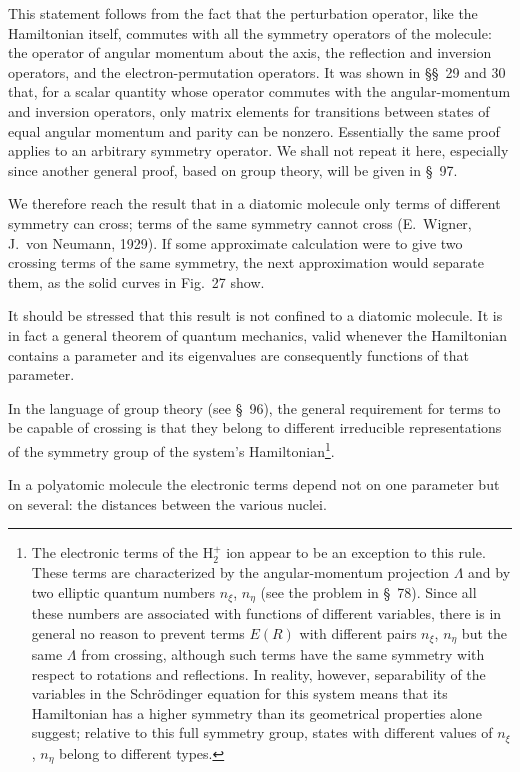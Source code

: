 This statement follows from the fact that the perturbation operator, like the Hamiltonian itself, commutes with all the symmetry operators of the molecule: the operator of angular momentum about the axis, the reflection and inversion operators, and the electron-permutation operators. It was shown in \S\S~29 and 30 that, for a scalar quantity whose operator commutes with the angular-momentum and inversion operators, only matrix elements for transitions between states of equal angular momentum and parity can be nonzero. Essentially the same proof applies to an arbitrary symmetry operator. We shall not repeat it here, especially since another general proof, based on group theory, will be given in \S~97.

We therefore reach the result that in a diatomic molecule only terms of different symmetry can cross; terms of the same symmetry cannot cross (E.~Wigner, J.~von Neumann, 1929). If some approximate calculation were to give two crossing terms of the same symmetry, the next approximation would separate them, as the solid curves in Fig.~27 show.

It should be stressed that this result is not confined to a diatomic molecule. It is in fact a general theorem of quantum mechanics, valid whenever the Hamiltonian contains a parameter and its eigenvalues are consequently functions of that parameter.

In the language of group theory (see \S~96), the general requirement for terms to be capable of crossing is that they belong to different irreducible representations of the symmetry group of the system's Hamiltonian\footnote{The electronic terms of the $\mathrm H_2^+$ ion appear to be an exception to this rule. These terms are characterized by the angular-momentum projection $\Lambda$ and by two elliptic quantum numbers $n_\xi$, $n_\eta$ (see the problem in \S~78). Since all these numbers are associated with functions of different variables, there is in general no reason to prevent terms $E(R)$ with different pairs $n_\xi$, $n_\eta$ but the same $\Lambda$ from crossing, although such terms have the same symmetry with respect to rotations and reflections. In reality, however, separability of the variables in the Schrödinger equation for this system means that its Hamiltonian has a higher symmetry than its geometrical properties alone suggest; relative to this full symmetry group, states with different values of $n_\xi$, $n_\eta$ belong to different types.}.

In a polyatomic molecule the electronic terms depend not on one parameter but on several: the distances between the various nuclei.

